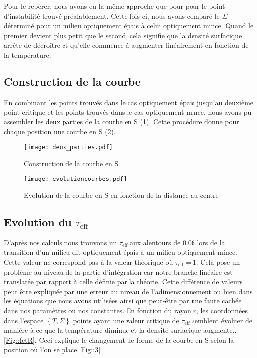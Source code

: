 Pour le repérer, nous avons eu la même approche que pour pour le point d'instabilité trouvé préalablement. Cette fois-ci, nous avons comparé le $\Sigma$ déterminé pour un milieu optiquement épais à celui optiquement mince. Quand le premier devient plus petit que le second, cela signifie que la densité surfacique arrête de décroître et qu'elle commence à augmenter linéairement en fonction de la température. 


\subsection{Construction de la courbe}

En combinant les points trouvés dans le cas optiquement épais jusqu'au deuxième point critique et les points trouvés dans le cas optiquement mince, nous avons pu assembler les deux parties de la courbe en S (\ref{Fig::construction_S}). Cette procédure donne pour chaque position une courbe en S (\ref{Fig::courbe_S_rayons}).

\begin{figure}[htb!]
	\centering
	\texttt{[image: deux\_parties.pdf]}
	\caption{Construction de la courbe en S}
	\label{Fig::construction_S}
\end{figure}

\begin{figure}[htb!]
	\centering
	\texttt{[image: evolutioncourbes.pdf]}
	\caption{Evolution de la courbe en S en fonction de la distance au centre}
	\label{Fig::courbe_S_rayons}
\end{figure}



\subsection{Evolution du $\tau_\textrm{eff}$}

D'après nos calculs nous trouvons un $\tau_\textrm{eff}$ aux alentours de $0.06$ lors de la transition d'un milieu dit optiquement épais à un milieu optiquement mince. Cette valeur ne correspond pas à la valeur théorique où $\tau_\textrm{eff} = 1$.
Celà pose un problème au niveau de la partie d'intégration car notre branche linéaire est translatée par rapport à celle définie par la théorie. 
Cette différence de valeurs peut être expliquée par une erreur au niveau de l’adimensionnement ou bien dans les équations que nous avons utilisées ainsi que peut-être par une faute cachée dans nos paramètres ou nos constantes. 
En fonction du rayon $r$, les coordonnées dans l'espace $\left\lbrace T, \Sigma\right\rbrace$ points ayant une valeur critique de $\tau_\textrm{eff}$ semblent évoluer de manière à ce que la température diminue et la densité surfacique augmente..\ref{Fig::fctR}. Ceci explique le changement de forme de la courbe en S selon la position où l'on se place.\ref{Fig::3}

